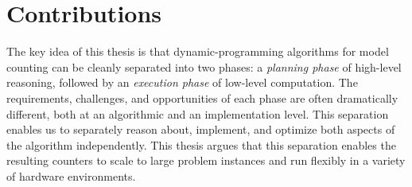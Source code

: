 


\section{Contributions}
The key idea of this thesis is that dynamic-programming algorithms for model counting can be cleanly separated into two phases: a \emph{planning phase} of high-level reasoning, followed by an \emph{execution phase} of low-level computation. 
The requirements, challenges, and opportunities of each phase are often dramatically different, both at an algorithmic and an implementation level.  
This separation enables us to separately reason about, implement, and optimize both aspects of the algorithm independently.
This thesis argues that this separation enables the resulting counters to scale to large problem instances and run flexibly in a variety of hardware environments.

